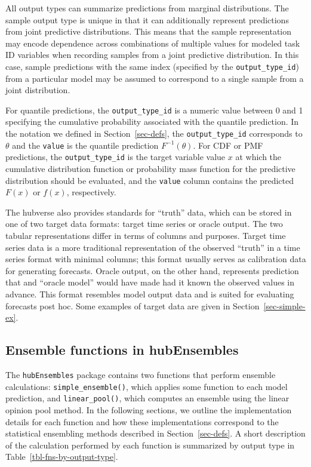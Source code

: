 \documentclass[
  letterpaper,
  DIV=11,
  numbers=noendperiod]{scrartcl}
\begin{document}
All output types can summarize predictions from marginal distributions.
The sample output type is unique in that it can additionally represent
predictions from joint predictive distributions. This means that the
sample representation may encode dependence across combinations of
multiple values for modeled task ID variables when recording samples
from a joint predictive distribution. In this case, sample predictions
with the same index (specified by the \texttt{output\_type\_id}) from a
particular model may be assumed to correspond to a single sample from a
joint distribution.

For quantile predictions, the \texttt{output\_type\_id} is a numeric
value between 0 and 1 specifying the cumulative probability associated
with the quantile prediction. In the notation we defined in
Section~\ref{sec-defs}, the \texttt{output\_type\_id} corresponds to
\(\theta\) and the \texttt{value} is the quantile prediction
\(F^{-1}(\theta)\). For CDF or PMF predictions, the
\texttt{output\_type\_id} is the target variable value \(x\) at which
the cumulative distribution function or probability mass function for
the predictive distribution should be evaluated, and the \texttt{value}
column contains the predicted \(F(x)\) or \(f(x)\), respectively.

The hubverse also provides standards for ``truth'' data, which can be
stored in one of two target data formats: target time series or oracle
output. The two tabular representations differ in terms of columns and
purposes. Target time series data is a more traditional representation
of the observed ``truth'' in a time series format with minimal columns;
this format usually serves as calibration data for generating forecasts.
Oracle output, on the other hand, represents prediction that and
``oracle model'' would have made had it known the observed values in
advance. This format resembles model output data and is suited for
evaluating forecasts post hoc. Some examples of target data are given in
Section~\ref{sec-simple-ex}.

\subsection{Ensemble functions in hubEnsembles}\label{sec-ens-fns}

The \texttt{hubEnsembles} package contains two functions that perform
ensemble calculations: \texttt{simple\_ensemble()}, which applies some
function to each model prediction, and \texttt{linear\_pool()}, which
computes an ensemble using the linear opinion pool method. In the
following sections, we outline the implementation details for each
function and how these implementations correspond to the statistical
ensembling methods described in Section~\ref{sec-defs}. A short
description of the calculation performed by each function is summarized
by output type in Table~\ref{tbl-fns-by-output-type}.
\end{document}
